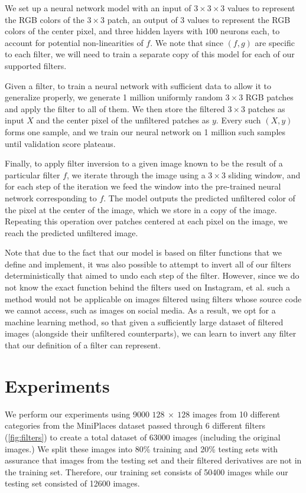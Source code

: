 \documentclass[11pt]{article}
\begin{document}
We set up a neural network model with an input of $3 \times 3 \times 3$ values to represent the RGB colors of the $3 \times 3$ patch, an output of $3$ values to represent the RGB colors of the center pixel, and three hidden layers with $100$ neurons each, to account for potential non-linearities of $f$. We note that since $(f, g)$ are specific to each filter, we will need to train a separate copy of this model for each of our supported filters.

Given a filter, to train a neural network with sufficient data to allow it to generalize properly, we generate 1 million uniformly random $3 \times 3$ RGB patches and apply the filter to all of them. We then store the filtered $3 \times 3$ patches as input $X$ and the center pixel of the unfiltered patches as $y$. Every such $(X, y)$ forms one sample, and we train our neural network on 1 million such samples until validation score plateaus.

Finally, to apply filter inversion to a given image known to be the result of a particular filter $f$, we iterate through the image using a $3 \times 3$ sliding window, and for each step of the iteration we feed the window into the pre-trained neural network corresponding to $f$. The model outputs the predicted unfiltered color of the pixel at the center of the image, which we store in a copy of the image. Repeating this operation over patches centered at each pixel on the image, we reach the predicted unfiltered image.

Note that due to the fact that our model is based on filter functions that we define and implement, it was also possible to attempt to invert all of our filters deterministically that aimed to undo each step of the filter. However, since we do not know the exact function behind the filters used on Instagram, et al. such a method would not be applicable on images filtered using filters whose source code we cannot access, such as images on social media. As a result, we opt for a machine learning method, so that given a sufficiently large dataset of filtered images (alongside their unfiltered counterparts), we can learn to invert any filter that our definition of a filter can represent.

\section*{Experiments}
We perform our experiments using 9000 $128\ \times\ 128$ images from 10 different categories from the MiniPlaces dataset \cite{Places} passed through 6 different filters (\cref{fig:filters}) to create a total dataset of 63000 images (including the original images.) We split these images into 80\% training and 20\% testing sets with assurance that images from the testing set and their filtered derivatives are not in the training set. Therefore, our training set consists of 50400 images while our testing set consisted of 12600 images.
\end{document}
